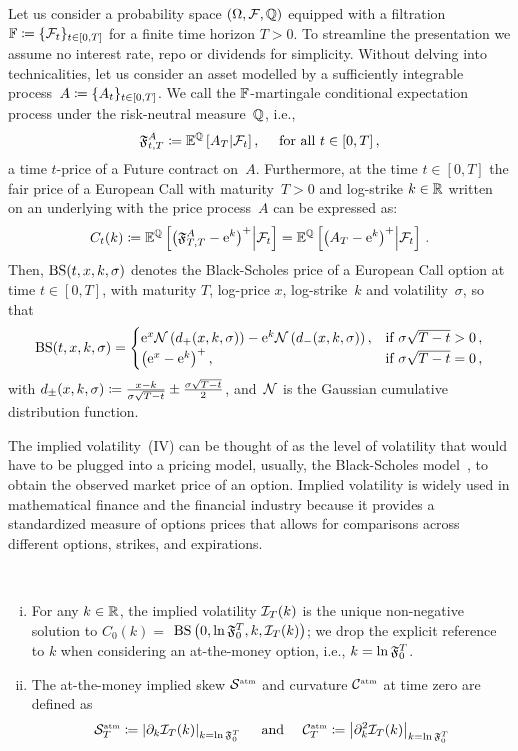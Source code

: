 Let us consider a probability space $(\Omega,\mathcal{F}, \mathbb{Q})$ equipped with a filtration $\mathbb{F}\coloneqq\{\mathcal{F}_t\}_{t\in[0,T]}$ for a finite time horizon $T>0$. To streamline the presentation we assume no interest rate, repo or dividends for simplicity. Without delving into technicalities, let us consider an asset modelled by a sufficiently integrable process~$A\coloneqq \{A_t\}_{t\in[0, T]}$. We call the $\mathbb{F}$-martingale conditional expectation process under the risk-neutral measure~$\mathbb{Q}$, i.e.,
\[
\mathfrak{F}_{t,T}^A\coloneqq\mathbb{E}^{\mathbb{Q}}\left[A_T\middle\vert\mathcal{F}_t\right], \quad \text { for all } t \in [0,T]\,,
\]
a time $t$-price of a Future contract on~$A$. Furthermore, at the time $t\in[0, T]$ the fair price of a European Call with maturity~$T>0$ and log-strike $k\in \mathbb{R}$ written on an underlying with the price process~$A$ can be expressed as:
\[
C_t(k) \coloneqq \mathbb{E}^{\mathbb{Q}}\left[\left(\mathfrak{F}_{T,T}^A - \mathrm{e}^k\right)^+\middle\vert\mathcal{F}_t\right] = \mathbb{E}^{\mathbb{Q}}\left[\left(A_T - \mathrm{e}^k\right)^+\middle\vert\mathcal{F}_t\right]\,.
\]
Then, $\mathrm{BS}(t, x, k, \sigma)$ denotes the Black-Scholes price of a European Call option at time $t \in [0, T]$, with maturity $T$, log-price $x$, log-strike~$k$ and volatility~$\sigma$, so that
$$
\mathrm{BS}(t, x, k, \sigma)= \begin{cases}\mathrm{e}^x \mathcal{N}\left(d_{+}(x, k, \sigma)\right)-\mathrm{e}^k \mathcal{N}\left(d_{-}(x, k, \sigma)\right), & \text {if } \sigma \sqrt{T-t}>0\,, \\ \left(\mathrm{e}^x-\mathrm{e}^k\right)^{+}, & \text {if } \sigma \sqrt{T-t}=0\,,\end{cases}
$$
with $d_{\pm}(x, k, \sigma)\coloneqq\frac{x-k}{\sigma \sqrt{T-t}} \pm \frac{\sigma \sqrt{T-t}}{2}$, and~$\mathcal{N}$ is the Gaussian cumulative distribution function. 

The implied volatility~(IV) can be thought of as the level of volatility that would have to be plugged into a pricing model, usually, the Black-Scholes model~\cite{Black1973TheLiabilities}, to obtain the observed market price of an option. Implied volatility is widely used in mathematical finance and the financial industry because it provides a standardized measure of options prices that allows for comparisons across different options, strikes, and expirations.
\begin{definition}\label{def:impliedvol}\
\begin{enumerate}[i.]
    \item For any $k \in \mathbb{R}$, the implied volatility $\mathcal{I}_T(k)$ is the unique non-negative solution to $C_0(k)=$ $\mathrm{BS}\left(0, \ln\mathfrak{F}_0^T, k, \mathcal{I}_T(k)\right)$; we drop the explicit reference to $k$ when considering an at-the-money option, i.e., $k=\ln\mathfrak{F}_0^T$.
    \item The at-the-money implied skew $\mathcal{S}^{\textup{\tiny atm}}$ and curvature $\mathcal{C}^{\textup{\tiny atm}}$ at time zero are defined as
    $$
    \mathcal{S}^{\textup{\tiny atm}}_T\coloneqq\left|\partial_k \mathcal{I}_T(k)\right|_{k=\ln\mathfrak{F}_0^T} \quad \text { and } \quad \mathcal{C}^{\textup{\tiny atm}}_T\coloneqq\left|\partial_k^2 \mathcal{I}_T(k)\right|_{k=\ln\mathfrak{F}_0^T}
    $$
\end{enumerate}
\end{definition}

